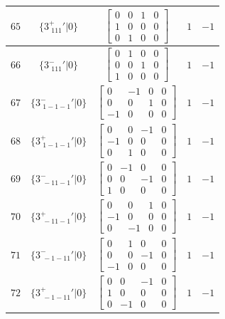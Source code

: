 \documentclass[fleqn,8pt]{jsarticle}
\begin{document}
\begin{longtable}{ccccc}
$ 65 $ & $ \{3^{+}_{\,\,111}{}'|0\} $ & $ \begin{bmatrix} 0 & 0 & 1 & 0 \\ 1 & 0 & 0 & 0 \\ 0 & 1 & 0 & 0 \end{bmatrix} $ & $ 1 $ & $ -1 $ \\ \hline
$ 66 $ & $ \{3^{-}_{\,\,111}{}'|0\} $ & $ \begin{bmatrix} 0 & 1 & 0 & 0 \\ 0 & 0 & 1 & 0 \\ 1 & 0 & 0 & 0 \end{bmatrix} $ & $ 1 $ & $ -1 $ \\ \hline
$ 67 $ & $ \{3^{-}_{\,\,1-1-1}{}'|0\} $ & $ \begin{bmatrix} 0 & -1 & 0 & 0 \\ 0 & 0 & 1 & 0 \\ -1 & 0 & 0 & 0 \end{bmatrix} $ & $ 1 $ & $ -1 $ \\ \hline
$ 68 $ & $ \{3^{+}_{\,\,1-1-1}{}'|0\} $ & $ \begin{bmatrix} 0 & 0 & -1 & 0 \\ -1 & 0 & 0 & 0 \\ 0 & 1 & 0 & 0 \end{bmatrix} $ & $ 1 $ & $ -1 $ \\ \hline
$ 69 $ & $ \{3^{-}_{\,\,-11-1}{}'|0\} $ & $ \begin{bmatrix} 0 & -1 & 0 & 0 \\ 0 & 0 & -1 & 0 \\ 1 & 0 & 0 & 0 \end{bmatrix} $ & $ 1 $ & $ -1 $ \\ \hline
$ 70 $ & $ \{3^{+}_{\,\,-11-1}{}'|0\} $ & $ \begin{bmatrix} 0 & 0 & 1 & 0 \\ -1 & 0 & 0 & 0 \\ 0 & -1 & 0 & 0 \end{bmatrix} $ & $ 1 $ & $ -1 $ \\ \hline
$ 71 $ & $ \{3^{-}_{\,\,-1-11}{}'|0\} $ & $ \begin{bmatrix} 0 & 1 & 0 & 0 \\ 0 & 0 & -1 & 0 \\ -1 & 0 & 0 & 0 \end{bmatrix} $ & $ 1 $ & $ -1 $ \\ \hline
$ 72 $ & $ \{3^{+}_{\,\,-1-11}{}'|0\} $ & $ \begin{bmatrix} 0 & 0 & -1 & 0 \\ 1 & 0 & 0 & 0 \\ 0 & -1 & 0 & 0 \end{bmatrix} $ & $ 1 $ & $ -1 $ \\ \hline

\end{longtable}
\end{document}
